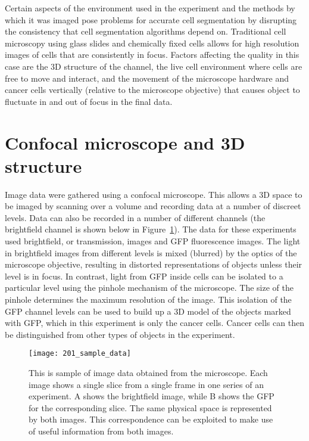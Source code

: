 Certain aspects of the environment used in the experiment and the methods by which it was imaged pose problems for accurate cell segmentation by disrupting the consistency that cell segmentation algorithms depend on. Traditional cell microscopy using glass slides and chemically fixed cells allows for high resolution images of cells that are consistently in focus. Factors affecting the quality in this case are the 3D structure of the channel, the live cell environment where cells are free to move and interact, and the movement of the microscope hardware and cancer cells vertically (relative to the microscope objective) that causes object to fluctuate in and out of focus in the final data.

\section{Confocal microscope and 3D structure}

Image data were gathered using a confocal microscope. This allows a 3D space to be imaged by scanning over a volume and recording data at a number of discreet levels. Data can also be recorded in a number of different channels (the brightfield channel is shown below in Figure~\ref{fig:sampleimagedata}). The data for these experiments used brightfield, or transmission, images and GFP fluorescence images. The light in brightfield images from different levels is mixed (blurred) by the optics of the microscope objective, resulting in distorted representations of objects unless their level is in focus. In contrast, light from GFP inside cells can be isolated to a particular level using the pinhole mechanism of the microscope. The size of the pinhole determines the maximum resolution of the image. This isolation of the GFP channel levels can be used to build up a 3D model of the objects marked with GFP, which in this experiment is only the cancer cells. Cancer cells can then be distinguished from other types of objects in the experiment.

\begin{figure}[h!]
 \centering
 \texttt{[image: 201\_sample\_data]}
 \caption[Sample image data]{
 	This is sample of image data obtained from the microscope. Each image shows a single slice from a single frame in one series of an experiment. A shows the brightfield image, while B shows the GFP for the corresponding slice. The same physical space is represented by both images. This correspondence can be exploited to make use of useful information from both images.
 }
 \label{fig:sampleimagedata}
\end{figure}

